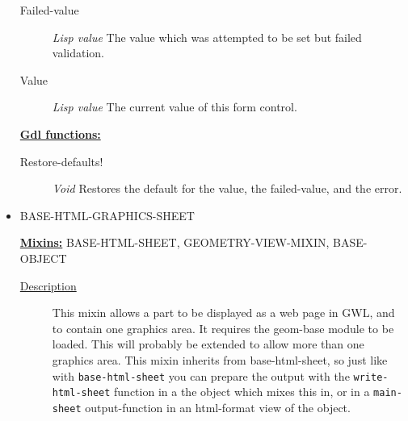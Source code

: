 \documentclass [11pt]{book}
\begin{document}
\begin{itemize}
\begin{description}
\item [Failed-value]
\emph{Lisp value} The value which was attempted to be set but failed validation.


\item [Value]
\emph{Lisp value} The current value of this form control.


\end{description}






\textbf{
\underline{Gdl functions:}}

\begin{description}

\item [Restore-defaults!]
\emph{Void} Restores the default for the value, the failed-value, and the error.


\end{description}







\item {}BASE-HTML-GRAPHICS-SHEET


\textbf{
\underline{Mixins:}} BASE-HTML-SHEET, GEOMETRY-VIEW-MIXIN, BASE-OBJECT





\begin{description}

\item [
\underline{Description}]


This mixin allows a part to be displayed as a web page in GWL, and
to contain one graphics area. It requires the geom-base module to be loaded. This will 
probably be extended to allow more than one graphics area. This mixin inherits from 
base-html-sheet, so just like with \texttt{base-html-sheet} you can prepare the output 
with the \texttt{write-html-sheet} function  in a the object which mixes  this in, or 
in a \texttt{main-sheet} output-function in an html-format view of the object.






\end{description}









\end{itemize}
\end{document}
